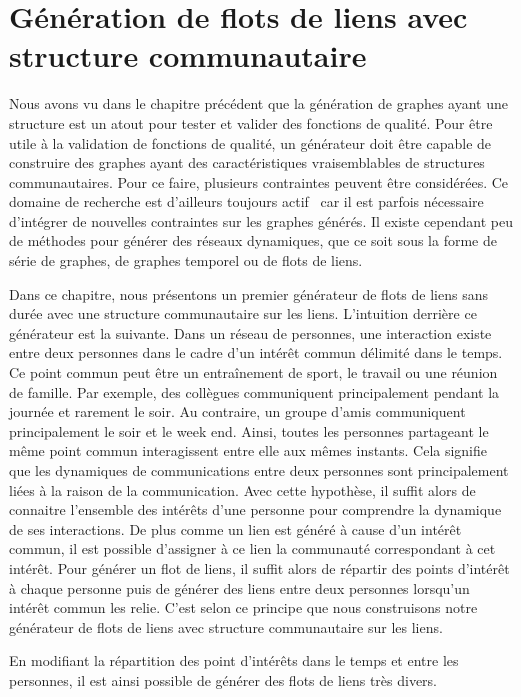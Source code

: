 \chapter{Génération de flots de liens avec structure communautaire}
\minitoc
\label{versQualite}

Nous avons vu dans le chapitre précédent que la génération de graphes ayant une structure est un atout pour tester et valider des fonctions de qualité.
Pour être utile à la validation de fonctions de qualité, un générateur doit être capable de construire des graphes ayant des caractéristiques vraisemblables de structures communautaires.
Pour ce faire, plusieurs contraintes peuvent être considérées.
Ce domaine de recherche est d'ailleurs toujours actif~\cite{Tabourier2011,Obradovic2014} car il est parfois nécessaire d'intégrer de nouvelles contraintes sur les graphes générés.
Il existe cependant peu de méthodes pour générer des réseaux dynamiques, que ce soit sous la forme de série de graphes, de graphes temporel ou de flots de liens.


Dans ce chapitre, nous présentons un premier générateur de flots de liens sans durée avec une structure communautaire sur les liens.
L'intuition derrière ce générateur est la suivante.
Dans un réseau de personnes, une interaction existe entre deux personnes dans le cadre d'un intérêt commun délimité dans le temps.
Ce point commun peut être un entraînement de sport, le travail ou une réunion de famille.
Par exemple, des collègues communiquent principalement pendant la journée et rarement le soir.
Au contraire, un groupe d'amis communiquent principalement le soir et le week end.
Ainsi, toutes les personnes partageant le même point commun interagissent entre elle aux mêmes instants.
Cela signifie que les dynamiques de communications entre deux personnes sont principalement liées à la raison de la communication.
Avec cette hypothèse, il suffit alors de connaitre l'ensemble des intérêts d'une personne pour comprendre la dynamique de ses interactions.
De plus comme un lien est généré à cause d'un intérêt commun, il est possible d'assigner à ce lien la communauté correspondant à cet intérêt.
Pour générer un flot de liens, il suffit alors de répartir des points d'intérêt à chaque personne puis de générer des liens entre deux personnes lorsqu'un intérêt commun les relie.
C'est selon ce principe que nous construisons notre générateur de flots de liens avec structure communautaire sur les liens.

En modifiant la répartition des point d'intérêts  dans le temps et entre les personnes, il est ainsi possible de générer des flots de liens très divers.

